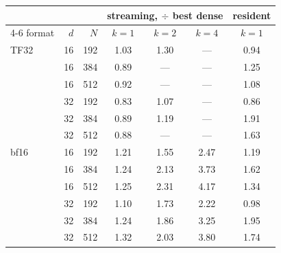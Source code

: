 \begin{tabular}{lrrcccc}
\toprule
& & & \multicolumn{3}{c}{\textbf{streaming}, $\div$ best dense} & \textbf{resident} \\
\cmidrule(lr){4-6}
format & $d$ & $N$ & $k{=}1$ & $k{=}2$ & $k{=}4$ & $k{=}1$ \\
\midrule
TF32 & 16 & 192 & 1.03 & 1.30 & --- & 0.94 \\
 & 16 & 384 & 0.89 & --- & --- & 1.25 \\
 & 16 & 512 & 0.92 & --- & --- & 1.08 \\
 & 32 & 192 & 0.83 & 1.07 & --- & 0.86 \\
 & 32 & 384 & 0.89 & 1.19 & --- & 1.91 \\
 & 32 & 512 & 0.88 & --- & --- & 1.63 \\
\midrule
bf16 & 16 & 192 & 1.21 & 1.55 & 2.47 & 1.19 \\
 & 16 & 384 & 1.24 & 2.13 & 3.73 & 1.62 \\
 & 16 & 512 & 1.25 & 2.31 & 4.17 & 1.34 \\
 & 32 & 192 & 1.10 & 1.73 & 2.22 & 0.98 \\
 & 32 & 384 & 1.24 & 1.86 & 3.25 & 1.95 \\
 & 32 & 512 & 1.32 & 2.03 & 3.80 & 1.74 \\
\bottomrule
\end{tabular}%
